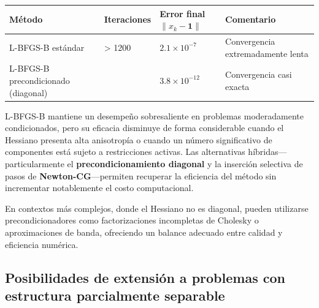 \documentclass[
  spanish,
  us-letterpaper,
  DIV=11,
  numbers=noendperiod]{scrreprt}
\numberwithin{equation}{section}
\begin{document}
\begin{longtable}[]{@{}
  >{\raggedright\arraybackslash}p{}
  >{\raggedright\arraybackslash}p{}
  >{\raggedright\arraybackslash}p{}
  >{\raggedright\arraybackslash}p{}@{}}
\toprule\noalign{}
\begin{minipage}[b]{\linewidth}\raggedright
Método
\end{minipage} & \begin{minipage}[b]{\linewidth}\raggedright
Iteraciones
\end{minipage} & \begin{minipage}[b]{\linewidth}\raggedright
Error final \(\|x_k - \mathbf{1}\|\)
\end{minipage} & \begin{minipage}[b]{\linewidth}\raggedright
Comentario
\end{minipage} \\
\midrule\noalign{}
\endhead
\bottomrule\noalign{}
\endlastfoot
L-BFGS-B estándar & \textgreater{} 1200 & \(2.1 \times 10^{-7}\) &
Convergencia extremadamente lenta \\
L-BFGS-B precondicionado (diagonal) & 15 & \(3.8 \times 10^{-12}\) &
Convergencia casi exacta \\
\end{longtable}

L-BFGS-B mantiene un desempeño sobresaliente en problemas moderadamente
condicionados, pero su eficacia disminuye de forma considerable cuando
el Hessiano presenta alta anisotropía o cuando un número significativo
de componentes está sujeto a restricciones activas. Las alternativas
híbridas---particularmente el \textbf{precondicionamiento diagonal} y la
inserción selectiva de pasos de \textbf{Newton-CG}---permiten recuperar
la eficiencia del método sin incrementar notablemente el costo
computacional.

En contextos más complejos, donde el Hessiano no es diagonal, pueden
utilizarse precondicionadores como factorizaciones incompletas de
Cholesky o aproximaciones de banda, ofreciendo un balance adecuado entre
calidad y eficiencia numérica.

\subsection{Posibilidades de extensión a problemas con estructura
parcialmente
separable}\label{posibilidades-de-extensiuxf3n-a-problemas-con-estructura-parcialmente-separable}
\end{document}
